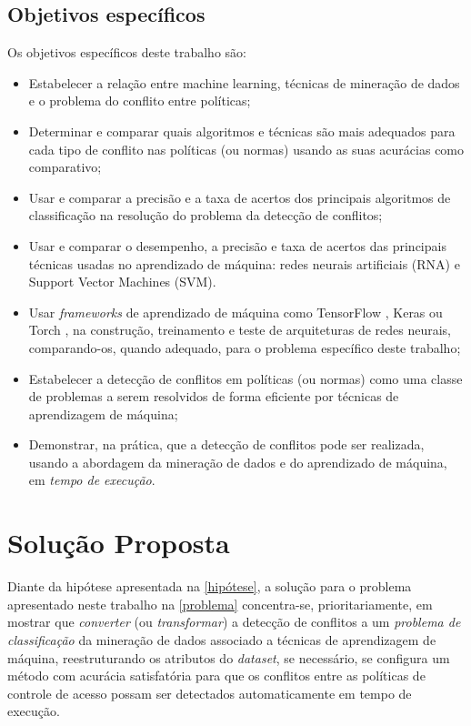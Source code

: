 \documentclass[
	12pt,				%
	openright,			%
	oneside,			%
	a4paper,			%
	english,			%
	french,				%
	spanish,			%
	brazil				%
	]{abntex2}
\begin{document}
\subsection{Objetivos específicos}
Os objetivos específicos deste trabalho são:
\begin{itemize}	
		\item Estabelecer a relação entre machine learning, técnicas de mineração de dados e o problema do conflito entre políticas;
		\item Determinar e comparar quais algoritmos e técnicas são mais adequados para cada tipo de conflito nas políticas (ou normas) usando as suas acurácias como comparativo;
		\item Usar e comparar a precisão e a taxa de acertos dos principais algoritmos de classificação na resolução do problema da detecção de conflitos;
		\item Usar e comparar o desempenho, a precisão e taxa de acertos das principais técnicas usadas no aprendizado de máquina: redes neurais artificiais (RNA) e Support Vector Machines (SVM).		
		\item Usar \textit{frameworks} de aprendizado de máquina como TensorFlow \cite{kadimisetty_tensorflow_2018}, Keras \cite{chollet2015keras} ou Torch \cite{NEURIPS2019_9015}, na construção, treinamento e teste de arquiteturas de redes neurais, comparando-os, quando adequado, para o problema específico deste trabalho;
		\item Estabelecer a detecção de conflitos em políticas (ou normas) como uma  classe de problemas a serem resolvidos de forma eficiente por técnicas de aprendizagem de máquina;
		\item Demonstrar, na prática, que a detecção de conflitos pode ser realizada, usando a abordagem da mineração de dados e do aprendizado de máquina, em \textit{tempo de execução}. 
\end{itemize}


\section{Solução Proposta}\label{solucao_proposta}
Diante da hipótese apresentada na \autoref{hipótese}, a solução para o problema apresentado neste trabalho na \autoref{problema} concentra-se, prioritariamente, em mostrar que \textit{converter} (ou \textit{transformar}) a detecção de conflitos a um \textit{problema de classificação} da mineração de dados associado a técnicas de aprendizagem de máquina, reestruturando os atributos do \textit{dataset}, se necessário, se configura um método com acurácia satisfatória para que os conflitos entre as políticas de controle de acesso possam ser detectados automaticamente em tempo de execução.
\end{document}
